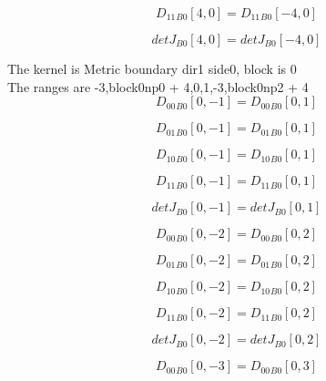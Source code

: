 \documentclass{article}
\begin{document}
\begin{dmath}{D_{11}{_{B0}}}[{4,0}] = {D_{11}{_{B0}}}[{-4,0}]\end{dmath}

\begin{dmath}{detJ{_{B0}}}[{4,0}] = {detJ{_{B0}}}[{-4,0}]\end{dmath}

\noindent The kernel is Metric boundary dir1 side0, block is 0\\\noindent The ranges are -3,block0np0 + 4,0,1,-3,block0np2 + 4\\\begin{dmath}{D_{00}{_{B0}}}[{0,-1}] = {D_{00}{_{B0}}}[{0,1}]\end{dmath}

\begin{dmath}{D_{01}{_{B0}}}[{0,-1}] = {D_{01}{_{B0}}}[{0,1}]\end{dmath}

\begin{dmath}{D_{10}{_{B0}}}[{0,-1}] = {D_{10}{_{B0}}}[{0,1}]\end{dmath}

\begin{dmath}{D_{11}{_{B0}}}[{0,-1}] = {D_{11}{_{B0}}}[{0,1}]\end{dmath}

\begin{dmath}{detJ{_{B0}}}[{0,-1}] = {detJ{_{B0}}}[{0,1}]\end{dmath}

\begin{dmath}{D_{00}{_{B0}}}[{0,-2}] = {D_{00}{_{B0}}}[{0,2}]\end{dmath}

\begin{dmath}{D_{01}{_{B0}}}[{0,-2}] = {D_{01}{_{B0}}}[{0,2}]\end{dmath}

\begin{dmath}{D_{10}{_{B0}}}[{0,-2}] = {D_{10}{_{B0}}}[{0,2}]\end{dmath}

\begin{dmath}{D_{11}{_{B0}}}[{0,-2}] = {D_{11}{_{B0}}}[{0,2}]\end{dmath}

\begin{dmath}{detJ{_{B0}}}[{0,-2}] = {detJ{_{B0}}}[{0,2}]\end{dmath}

\begin{dmath}{D_{00}{_{B0}}}[{0,-3}] = {D_{00}{_{B0}}}[{0,3}]\end{dmath}
\end{document}
